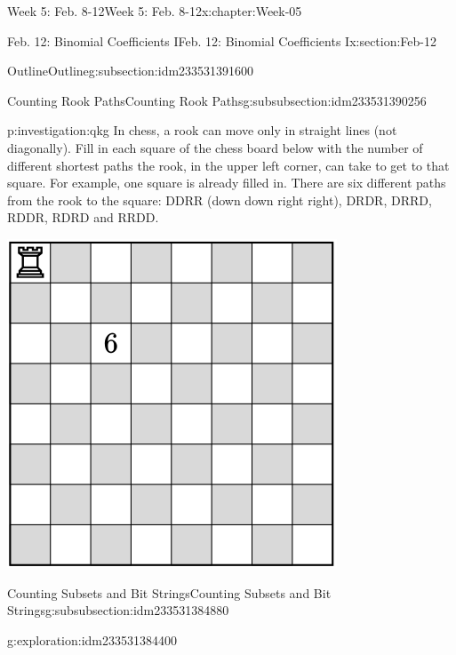 \documentclass[oneside,10pt,]{book}
\numberwithin{equation}{section}
\begin{document}
\begin{chapterptx}{Week 5: Feb. 8-12}{}{Week 5: Feb. 8-12}{}{}{x:chapter:Week-05}
\begin{sectionptx}{Feb. 12: Binomial Coefficients I}{}{Feb. 12: Binomial Coefficients I}{}{}{x:section:Feb-12}
\begin{subsectionptx}{Outline}{}{Outline}{}{}{g:subsection:idm233531391600}
\begin{subsubsectionptx}{Counting Rook Paths}{}{Counting Rook Paths}{}{}{g:subsubsection:idm233531390256}
\begin{investigation}{}{p:investigation:qkg}%
%
%
%
%
In chess, a rook can move only in straight lines (not diagonally). Fill in each square of the chess board below with the number of different shortest paths the rook, in the upper left corner, can take to get to that square. For example, one square is already filled in. There are six different paths from the rook to the square: DDRR (down down right right), DRDR, DRRD, RDDR, RDRD and RRDD.%
\begin{sidebyside}{1}{0.25}{0.25}{0}%
\begin{sbspanel}{0.5}%
\includegraphics[width=\linewidth]{./img/chessboard.svg}
\end{sbspanel}%
\end{sidebyside}%
\end{investigation}%
\end{subsubsectionptx}
%
%
\typeout{************************************************}
\typeout{************************************************}
%
\begin{subsubsectionptx}{Counting Subsets and Bit Strings}{}{Counting Subsets and Bit Strings}{}{}{g:subsubsection:idm233531384880}
\begin{exploration}{}{g:exploration:idm233531384400}%

\end{exploration}
\end{subsubsectionptx}
\end{subsectionptx}
\end{sectionptx}
\end{chapterptx}
\end{document}

